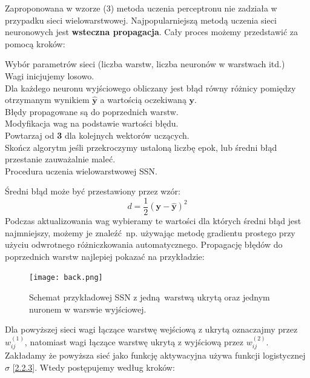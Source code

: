 \documentclass{article}
\renewcommand{\vec}[1]{\mathbf{#1}}
\begin{document}
Zaproponowana w wzorze (3) metoda uczenia perceptronu nie zadziała w przypadku sieci
wielowarstwowej. Najpopularniejszą metodą uczenia sieci neuronowych 
jest \textbf{wsteczna propagacja}. Cały proces możemy przedstawić za pomocą kroków:

{\LinesNumbered
\begin{algorithm}[H]
 Wybór parametrów sieci (liczba warstw, liczba neuronów w warstwach itd.)\\
 Wagi inicjujemy losowo.\\
 Dla każdego neuronu wyjściowego obliczany jest błąd równy różnicy pomiędzy otrzymanym
 wynikiem $\hat{\vec{y}}$ a wartością oczekiwaną $\vec{y}$.\\
 Błędy propagowane są do poprzednich warstw.\\
 Modyfikacja wag na podstawie wartości błędu.\\
 Powtarzaj od \textbf{3} dla kolejnych wektorów uczących.\\
 Skończ algorytm jeśli przekroczymy ustaloną liczbę epok, lub średni błąd przestanie zauważalnie
 maleć.\\
 \caption{Procedura uczenia wielowarstwowej SSN.}
\end{algorithm}}
Średni błąd może być przestawiony przez wzór:
\begin{equation}
	d = \frac{1}{2}(\vec{y} - \hat{\vec{y}})^2
\end{equation}
Podczas aktualizowania wag wybieramy te wartości dla których średni błąd jest najmniejszy, możemy
je znaleźć np. używając metodę gradientu prostego przy użyciu odwrotnego różniczkowania
automatycznego.
Propagację błędów do poprzednich warstw najlepiej pokazać na przykładzie:
\begin{figure}[H]
\centering
\texttt{[image: back.png]}
\caption{Schemat przykładowej SSN z jedną warstwą ukrytą oraz jednym nuronem w warswie
wyjściowej.}
\end{figure}
Dla powyższej sieci wagi łączące warstwę wejściową z ukrytą oznaczajmy przez 
$w_{ij}^{(1)}$, natomiast wagi łączące warstwę ukrytą z wyjściową przez 
$w_{ij}^{(2)}$. Zakładamy że powyższa sieć jako
funkcję aktywacyjna używa funkcji logistycznej $\sigma$ [\hyperref[sec:fa]{2.2.3}].
Wtedy postępujemy według kroków:\\
\end{document}
